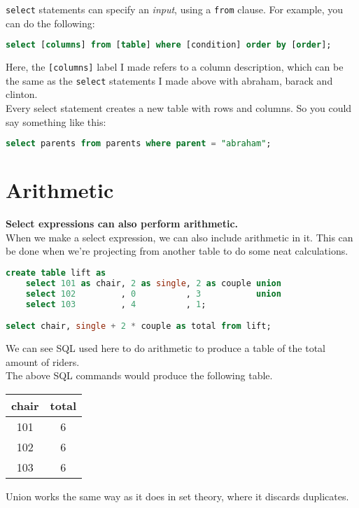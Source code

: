 \documentclass[12pt]{article}
\begin{document}
\texttt{select} statements can specify an \textit{input}, using a \texttt{from} clause. For example, you can do the following:\\

\begin{lstlisting}[language=sql]
select [columns] from [table] where [condition] order by [order];
\end{lstlisting}

Here, the \texttt{[columns]} label I made refers to a column description, which can be the same as the \texttt{select} statements I made above with abraham, barack and clinton.\\

Every select statement creates a new table with rows and columns. So you could say something like this:

\begin{lstlisting}[language=sql]
select parents from parents where parent = "abraham";
\end{lstlisting}

\section{Arithmetic}

\textbf{Select expressions can also perform arithmetic.}\\

When we make a select expression, we can also include arithmetic in it. This can be done when we're projecting from another table to do some neat calculations.\\

\begin{lstlisting}[language=sql]
create table lift as
    select 101 as chair, 2 as single, 2 as couple union
    select 102         , 0          , 3           union
    select 103         , 4          , 1;

select chair, single + 2 * couple as total from lift;
\end{lstlisting}

\hfill \break We can see SQL used here to do arithmetic to produce a table of the total amount of riders.\\

The above SQL commands would produce the following table.

\begin{center}
\begin{tabular}{ |c|c| } 
 \hline
 \textbf{chair} & \textbf{total} \\
 \hline 
 101 & 6 \\ 
 102 & 6 \\
 103 & 6\\ 
 \hline
\end{tabular}
\end{center}

Union works the same way as it does in set theory, where it discards duplicates.\\













\end{document}
